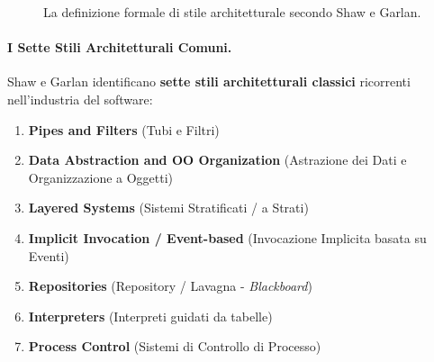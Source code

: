 \documentclass[12pt]{extarticle}
\begin{document}
\begin{figure}[htbp]
\centering
{}
\caption{La definizione formale di stile architetturale secondo Shaw e Garlan.}
\label{fig:garlan_shaw_definition}
\end{figure}

\paragraph{I Sette Stili Architetturali Comuni.}
Shaw e Garlan identificano \textbf{sette stili architetturali classici} ricorrenti nell'industria del software:
\begin{enumerate}
    \item \textbf{Pipes and Filters} (Tubi e Filtri)
    \item \textbf{Data Abstraction and OO Organization} (Astrazione dei Dati e Organizzazione a Oggetti)
    \item \textbf{Layered Systems} (Sistemi Stratificati / a Strati)
    \item \textbf{Implicit Invocation / Event-based} (Invocazione Implicita basata su Eventi)
    \item \textbf{Repositories} (Repository / Lavagna - \textit{Blackboard})
    \item \textbf{Interpreters} (Interpreti guidati da tabelle)
    \item \textbf{Process Control} (Sistemi di Controllo di Processo)
\end{enumerate}
\end{document}
